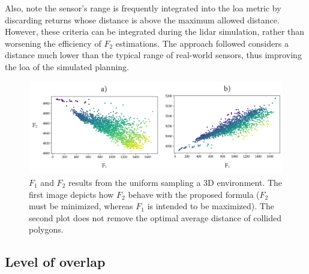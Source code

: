 Also, note the sensor's range is frequently integrated into the \acrshort{loa} metric by discarding returns whose distance is above the maximum allowed distance. However, these criteria can be integrated during the \acrshort{lidar} simulation, rather than worsening the efficiency of $F_2$ estimations. The approach followed considers a distance much lower than the typical range of real-world sensors, thus improving the \acrshort{loa} of the simulated planning.

\begin{figure}
    \centering
    \includegraphics[width=\linewidth]{figs/lidar_optimization/f2_sampling.png}
	\caption{$F_1$ and $F_2$ results from the uniform sampling a 3D environment. The first image depicts how $F_2$ behave with the proposed formula ($F_2$ must be minimized, whereas $F_1$ is intended to be maximized). The second plot does not remove the optimal average distance of collided polygons.}
	\label{fig:f2_sampling}
\end{figure}

\subsection{Level of overlap}

